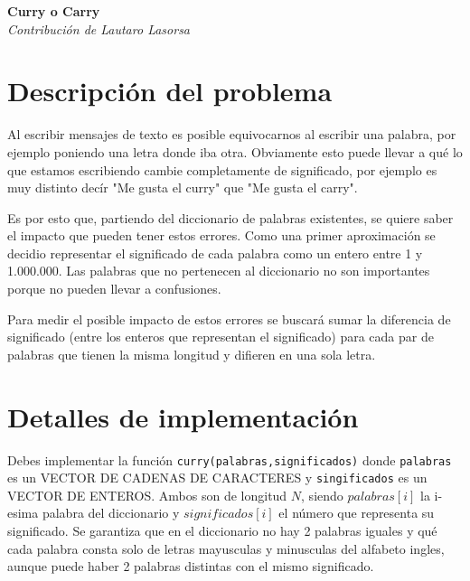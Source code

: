 \documentclass[fontsize=13pt, paper=a4, DIV=calc]{scrartcl}
\renewcommand*{\maketitle}{
	\begin{center}
		\textbf{\nombre}\\
		\textit{\footnotesize Contribución de \author}
	\end{center}
}
\begin{document}
\def\contest{OIA Certamen Nacional}
\def\nombre{Curry o Carry}
\def\author{Lautaro Lasorsa}
\def\niveldia{}
\def\numero{}
\def\archivo{curry}%
\def\version{}


\maketitle
\begin{multicols*}{2}

\section{Descripción del problema}

Al escribir mensajes de texto es posible equivocarnos al escribir una palabra, por ejemplo poniendo una letra donde iba otra. Obviamente esto puede llevar a qué lo que estamos escribiendo cambie completamente de significado, por ejemplo es muy distinto decír "Me gusta el curry" que "Me gusta el carry".

Es por esto que, partiendo del diccionario de palabras existentes, se quiere saber el impacto que pueden tener estos errores. Como una primer aproximación se decidio representar el significado de cada palabra como un entero entre 1 y 1.000.000. Las palabras que no pertenecen al diccionario no son importantes porque no pueden llevar a confusiones.

Para medir el posible impacto de estos errores se buscará sumar la diferencia de significado (entre los enteros que representan el significado) para cada par de palabras que tienen la misma longitud y difieren en una sola letra.

\section{Detalles de implementación}

Debes implementar la función \texttt{curry(palabras,significados)} donde \texttt{palabras} es un {VECTOR DE CADENAS DE CARACTERES} y \texttt{singificados} es un {VECTOR DE ENTEROS}. Ambos son de longitud $N$, siendo $palabras[i]$ la i-esima palabra del diccionario y $significados[i]$ el número que representa su significado. Se garantiza que en el diccionario no hay 2 palabras iguales y qué cada palabra consta solo de letras mayusculas y minusculas del alfabeto ingles, aunque puede haber 2 palabras distintas con el mismo significado. 


\end{multicols*}
\end{document}
